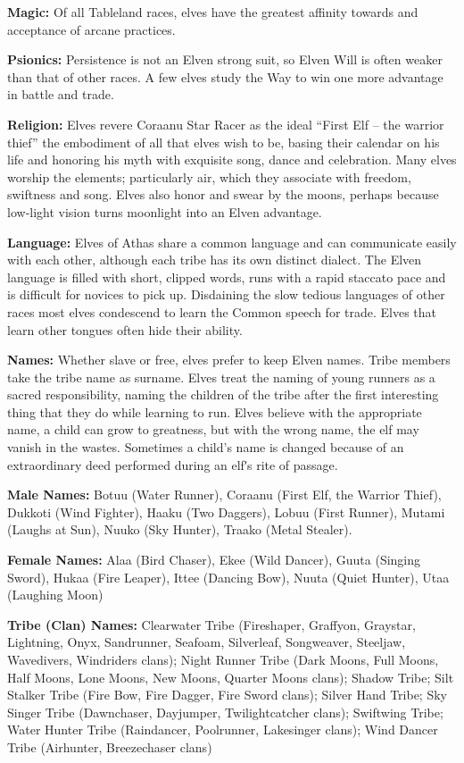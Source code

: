 \documentclass[10pt,a4paper,twocolumn]{d20}
\begin{document}
\textbf{Magic:} Of all Tableland races, elves have the greatest affinity towards and acceptance of arcane practices.

\textbf{Psionics:} Persistence is not an Elven strong suit, so Elven Will is often weaker than that of other races. A few elves study the Way to win one more advantage in battle and trade.

\textbf{Religion:} Elves revere Coraanu Star Racer as the ideal ``First Elf – the warrior thief'' the embodiment of all that elves wish to be, basing their calendar on his life and honoring his myth with exquisite song, dance and celebration. Many elves worship the elements; particularly air, which they associate with freedom, swiftness and song. Elves also honor and swear by the moons, perhaps because low‐light vision turns moonlight into an Elven advantage.

\textbf{Language:} Elves of Athas share a common language and can communicate easily with each other, although each tribe has its own distinct dialect. The Elven language is filled with short, clipped words, runs with a rapid staccato pace and is difficult for novices to pick up. Disdaining the slow tedious languages of other races most elves condescend to learn the Common speech for trade. Elves that learn other tongues often hide their ability.

\textbf{Names:} Whether slave or free, elves prefer to keep Elven names. Tribe members take the tribe name as surname. Elves treat the naming of young runners as a sacred responsibility, naming the children of the tribe after the first interesting thing that they do while learning to run. Elves believe with the appropriate name, a child can grow to greatness, but with the wrong name, the elf may vanish in the wastes. Sometimes a child’s name is changed because of an extraordinary deed performed during an elfʹs rite of passage.

\textbf{Male Names:} Botuu (Water Runner), Coraanu (First Elf, the Warrior Thief), Dukkoti (Wind Fighter), Haaku (Two Daggers), Lobuu (First Runner), Mutami (Laughs at Sun), Nuuko (Sky Hunter), Traako (Metal Stealer).

\textbf{Female Names:} Alaa (Bird Chaser), Ekee (Wild Dancer), Guuta (Singing Sword), Hukaa (Fire Leaper), Ittee (Dancing Bow), Nuuta (Quiet Hunter), Utaa (Laughing Moon)

\textbf{Tribe (Clan) Names:} Clearwater Tribe (Fireshaper, Graffyon, Graystar, Lightning, Onyx, Sandrunner, Seafoam, Silverleaf, Songweaver, Steeljaw, Wavedivers, Windriders clans); Night Runner Tribe (Dark Moons, Full Moons, Half Moons, Lone Moons, New Moons, Quarter Moons clans); Shadow Tribe; Silt Stalker Tribe (Fire Bow, Fire Dagger, Fire Sword clans); Silver Hand Tribe; Sky Singer Tribe (Dawnchaser, Dayjumper, Twilightcatcher clans); Swiftwing Tribe; Water Hunter Tribe (Raindancer, Poolrunner, Lakesinger clans); Wind Dancer Tribe (Airhunter, Breezechaser clans)
\end{document}
